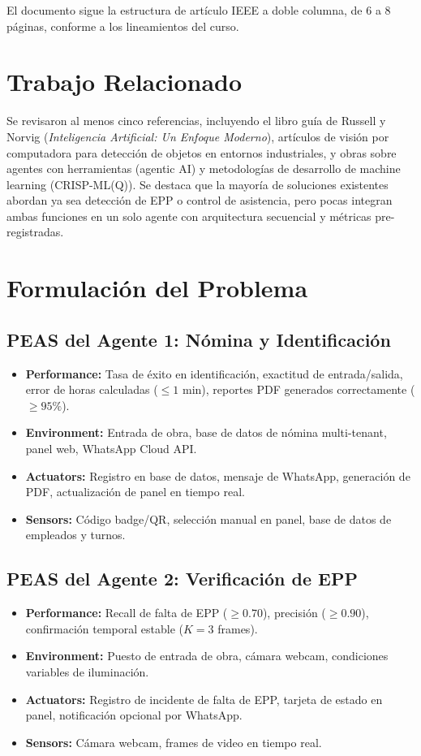 \documentclass[conference,spanish]{IEEEtran}
\begin{document}
El documento sigue la estructura de artículo IEEE a doble columna, de 6 a 8 páginas, conforme a los lineamientos del curso.

\section{Trabajo Relacionado}
Se revisaron al menos cinco referencias, incluyendo el libro guía de Russell y Norvig (\emph{Inteligencia Artificial: Un Enfoque Moderno}), artículos de visión por computadora para detección de objetos en entornos industriales, y obras sobre agentes con herramientas (agentic AI) y metodologías de desarrollo de machine learning (CRISP-ML(Q)). Se destaca que la mayoría de soluciones existentes abordan ya sea detección de EPP o control de asistencia, pero pocas integran ambas funciones en un solo agente con arquitectura secuencial y métricas pre-registradas.

\section{Formulación del Problema}
\subsection{PEAS del Agente 1: Nómina y Identificación}
\begin{itemize}
    \item \textbf{Performance:} Tasa de éxito en identificación, exactitud de entrada/salida, error de horas calculadas ($\le 1$ min), reportes PDF generados correctamente ($\ge 95\%$).
    \item \textbf{Environment:} Entrada de obra, base de datos de nómina multi-tenant, panel web, WhatsApp Cloud API.
    \item \textbf{Actuators:} Registro en base de datos, mensaje de WhatsApp, generación de PDF, actualización de panel en tiempo real.
    \item \textbf{Sensors:} Código badge/QR, selección manual en panel, base de datos de empleados y turnos.
\end{itemize}

\subsection{PEAS del Agente 2: Verificación de EPP}
\begin{itemize}
    \item \textbf{Performance:} Recall de falta de EPP ($\ge 0.70$), precisión ($\ge 0.90$), confirmación temporal estable ($K=3$ frames).
    \item \textbf{Environment:} Puesto de entrada de obra, cámara webcam, condiciones variables de iluminación.
    \item \textbf{Actuators:} Registro de incidente de falta de EPP, tarjeta de estado en panel, notificación opcional por WhatsApp.
    \item \textbf{Sensors:} Cámara webcam, frames de video en tiempo real.
\end{itemize}
\end{document}
